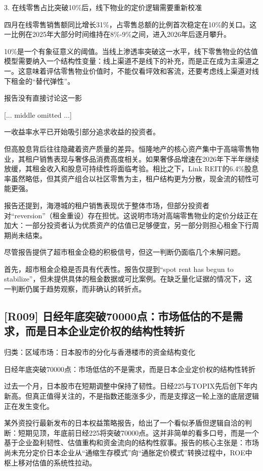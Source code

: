 \documentclass[11pt]{ctexart}
\begin{document}
3. 在线零售占比突破10\%后，线下物业的定价逻辑需要重新校准

四月在线零售销售额同比增长31\%，占零售总额的比例首次稳定在10\%的关口。这一比例在2025年大部分时间维持在8\%-9\%之间，进入2026年后逐月攀升。

10\%是一个有象征意义的阈值。当线上渗透率突破这一水平，线下零售物业的估值模型需要纳入一个结构性变量：线上渠道不是线下的补充，而是正在成为主渠道之一。这意味着评估零售物业价值时，不能仅看坪效和客流，还要考虑线上渠道对线下租金的“替代弹性”。

报告没有直接讨论这一影

[... middle omitted ...]

一收益率水平已开始吸引部分追求收益的投资者。

但高股息背后往往隐藏着资产质量的差异。恒隆地产的核心资产集中于高端零售物业，其租户销售表现与奢侈品消费高度相关。如果奢侈品增速在2026年下半年继续放缓，其租金收入和股息可持续性将面临考验。相比之下，Link REIT的6.4\%股息率虽然略低，但其资产组合以社区零售为主，租户结构更为分散，现金流的韧性可能更强。

报告还提到，海港城的租户销售表现优于整体市场，但部分投资者对“reversion”（租金重设）存在担忧。这说明市场对高端零售物业的定价分歧正在加大：一部分投资者认为优质资产的估值已足够便宜，另一部分则担心租金下行周期尚未结束。

尽管报告提供了超市租金企稳的积极信号，但这一判断仍面临几个未解问题。

首先，超市租金企稳是否具有代表性。报告仅提到“spot rent has begun to stabilize”，但未提供具体的租金数据或可比案例。在缺乏量化证据的情况下，这一判断仍属于趋势观察，而非确认的转折点。

\subsection{[R009] 日经年底突破70000点：市场低估的不是需求，而是日本企业定价权的结构性转折}
{\small\color{refgray}归类：区域市场：日本股市的分化与香港楼市的资金结构变化}

日经年底突破70000点：市场低估的不是需求，而是日本企业定价权的结构性转折

过去一个月，日本股市在短期调整中保持了韧性。日经225与TOPIX先后创下年内新高。但真正值得关注的，不是指数还能涨多少，而是支撑这一轮上涨的底层逻辑正在发生变化。

某外资投行最新发布的日本权益策略报告，给出了一个看似矛盾但逻辑自洽的判断：短期见顶，年底前日经225将突破70000点。这并非简单的看多口号，而是一个基于企业盈利韧性、估值重构和资金流向的结构性叙事。报告的核心主张是：市场尚未充分定价日本企业从“通缩生存模式”向“通胀定价模式”转换过程中，ROE中枢上移对估值的系统性拉动。
\end{document}
